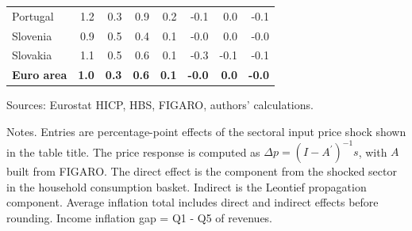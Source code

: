 \documentclass[11pt]{article}
\begin{document}
\begin{table}[H]
\begin{tabular}{lrrrrrrr}
Portugal & 1.2 & 0.3 & 0.9 & 0.2 & -0.1 & 0.0 & -0.1
 \\
Slovenia & 0.9 & 0.5 & 0.4 & 0.1 & -0.0 & 0.0 & -0.0
 \\
Slovakia & 1.1 & 0.5 & 0.6 & 0.1 & -0.3 & -0.1 & -0.1
 \\
\midrule
\textbf{Euro area} & \textbf{1.0} & \textbf{0.3} & \textbf{0.6} & \textbf{0.1} & \textbf{-0.0} & \textbf{0.0} & \textbf{-0.0}
 \\
\bottomrule
\end{tabular}
\par\vspace{0.35em}\footnotesize\noindent Sources: Eurostat HICP, HBS, FIGARO, authors' calculations.
\par\vspace{0.25em}\footnotesize\noindent Notes. Entries are percentage-point effects of the sectoral input price shock shown in the table title. The price response is computed as $\Delta p = (I - A^{\prime})^{-1}s$, with $A$ built from FIGARO. The direct effect is the component from the shocked sector in the household consumption basket. Indirect is the Leontief propagation component. Average inflation total includes direct and indirect effects before rounding. Income inflation gap = Q1 - Q5 of revenues.
\end{table}
\vspace{0.6em}
\end{document}

